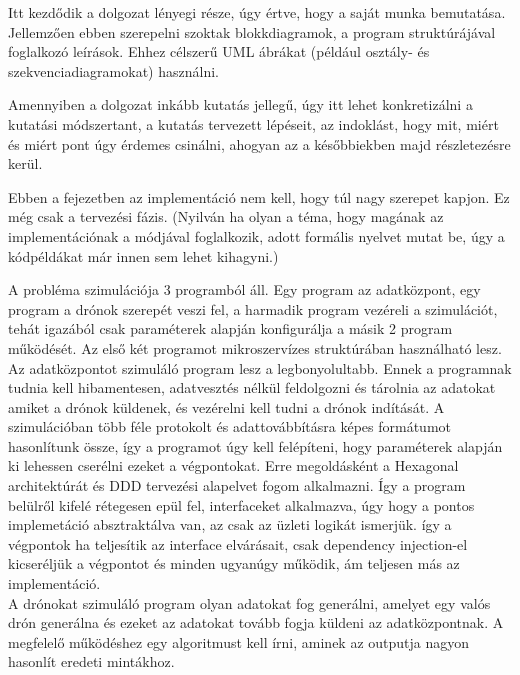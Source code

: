 
Itt kezdődik a dolgozat lényegi része, úgy értve, hogy a saját munka bemutatása.
Jellemzően ebben szerepelni szoktak blokkdiagramok, a program struktúrájával foglalkozó leírások.
Ehhez célszerű UML ábrákat (például osztály- és szekvenciadiagramokat) használni.

Amennyiben a dolgozat inkább kutatás jellegű, úgy itt lehet konkretizálni a kutatási módszertant, a kutatás tervezett lépéseit, az indoklást, hogy mit, miért és miért pont úgy érdemes csinálni, ahogyan az a későbbiekben majd részletezésre kerül.

Ebben a fejezetben az implementáció nem kell, hogy túl nagy szerepet kapjon.
Ez még csak a tervezési fázis.
(Nyilván ha olyan a téma, hogy magának az implementációnak a módjával foglalkozik, adott formális nyelvet mutat be, úgy a kódpéldákat már innen sem lehet kihagyni.)

A probléma szimulációja 3 programból áll. Egy program az adatközpont, egy program a drónok szerepét veszi fel, a harmadik program vezéreli a szimulációt,
tehát igazából csak paraméterek alapján konfigurálja a másik 2 program működését. Az első két programot mikroszervízes struktúrában használható lesz.\\
Az adatközpontot szimuláló program lesz a legbonyolultabb. Ennek a programnak tudnia kell hibamentesen, adatvesztés nélkül
feldolgozni és tárolnia az adatokat amiket a drónok küldenek, és vezérelni kell tudni a drónok indítását.
A szimulációban több féle protokolt és adattovábbításra képes formátumot hasonlítunk össze, így a programot úgy kell felépíteni,
hogy paraméterek alapján ki lehessen cserélni ezeket a végpontokat.
Erre megoldásként a Hexagonal architektúrát és DDD tervezési alapelvet fogom alkalmazni.
Így a program belülről kifelé rétegesen epül fel, interfaceket alkalmazva, úgy hogy a pontos implemetáció absztraktálva van, az csak az üzleti logikát ismerjük.
így a végpontok ha teljesítik az interface elvárásait, csak dependency injection-el kicseréljük a végpontot és minden ugyanúgy működik, ám teljesen más az implementáció.\\
A drónokat szimuláló program olyan adatokat fog generálni, amelyet egy valós drón generálna és ezeket az adatokat tovább fogja küldeni az adatközpontnak.
A megfelelő működéshez egy algoritmust kell írni, aminek az outputja nagyon hasonlít eredeti mintákhoz.


